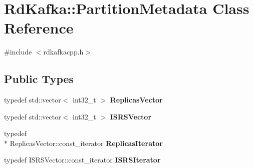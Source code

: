 \hypertarget{classRdKafka_1_1PartitionMetadata}{\section{Rd\-Kafka\-:\-:Partition\-Metadata Class Reference}
\label{classRdKafka_1_1PartitionMetadata}
}


{\ttfamily \#include $<$rdkafkacpp.\-h$>$}

\subsection*{Public Types}
\begin{DoxyCompactItemize}
\item 
\hypertarget{classRdKafka_1_1PartitionMetadata_aecb5ee6375494d28a1bef9fac049f147}{typedef std\-::vector$<$ int32\-\_\-t $>$ {\bfseries Replicas\-Vector}}\label{classRdKafka_1_1PartitionMetadata_aecb5ee6375494d28a1bef9fac049f147}

\item 
\hypertarget{classRdKafka_1_1PartitionMetadata_a0683f0879c9c4474eddd271bda865065}{typedef std\-::vector$<$ int32\-\_\-t $>$ {\bfseries I\-S\-R\-S\-Vector}}\label{classRdKafka_1_1PartitionMetadata_a0683f0879c9c4474eddd271bda865065}

\item 
\hypertarget{classRdKafka_1_1PartitionMetadata_a8b21e2f83d21e44139640ccbd01040db}{typedef \\*
Replicas\-Vector\-::const\-\_\-iterator {\bfseries Replicas\-Iterator}}\label{classRdKafka_1_1PartitionMetadata_a8b21e2f83d21e44139640ccbd01040db}

\item 
\hypertarget{classRdKafka_1_1PartitionMetadata_a6ce31da0cebc55cdb9ca61a752046d7b}{typedef I\-S\-R\-S\-Vector\-::const\-\_\-iterator {\bfseries I\-S\-R\-S\-Iterator}}\label{classRdKafka_1_1PartitionMetadata_a6ce31da0cebc55cdb9ca61a752046d7b}

\end{DoxyCompactItemize}
